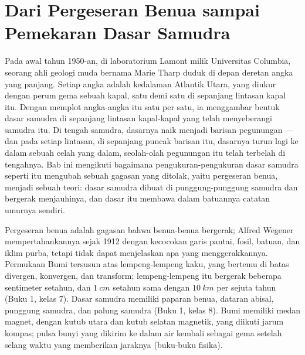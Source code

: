 \chapter{Dari Pergeseran Benua sampai Pemekaran Dasar Samudra}\label{ch:g11:drift-to-spreading}

Pada awal tahun 1950-an, di laboratorium Lamont milik Universitas Columbia,
seorang ahli geologi muda bernama Marie Tharp duduk di depan deretan angka yang
panjang. Setiap angka adalah kedalaman Atlantik Utara, yang diukur dengan perum
gema sebuah kapal, satu demi satu di sepanjang lintasan kapal itu. Dengan
memplot angka-angka itu satu per satu, ia menggambar bentuk dasar samudra di
sepanjang lintasan kapal-kapal yang telah menyeberangi samudra itu. Di tengah
samudra, dasarnya naik menjadi barisan pegunungan --- dan pada setiap lintasan,
di sepanjang puncak barisan itu, dasarnya turun lagi ke dalam sebuah celah yang
dalam, seolah-olah pegunungan itu telah terbelah di tengahnya. Bab ini
mengikuti bagaimana pengukuran-pengukuran dasar samudra seperti itu mengubah
sebuah gagasan yang ditolak, yaitu pergeseran benua, menjadi sebuah teori:
dasar samudra dibuat di punggung-punggung samudra dan bergerak menjauhinya,
dan dasar itu membawa dalam batuannya catatan umurnya sendiri.

\begin{recall}
Pergeseran benua adalah gagasan bahwa benua-benua bergerak; Alfred Wegener
mempertahankannya sejak 1912 dengan kecocokan garis pantai, fosil, batuan, dan
iklim purba, tetapi tidak dapat menjelaskan apa yang menggerakkannya. Permukaan
Bumi tersusun atas lempeng-lempeng kaku, yang bertemu di batas divergen,
konvergen, dan transform; lempeng-lempeng itu bergerak beberapa sentimeter
setahun, dan $\qty{1}{cm}$ setahun sama dengan $\qty{10}{km}$ per sejuta tahun
(Buku 1, kelas 7). Dasar samudra memiliki paparan benua, dataran abisal,
punggung samudra, dan palung samudra (Buku 1, kelas 8). Bumi memiliki medan
magnet, dengan kutub utara dan kutub selatan magnetik, yang diikuti jarum
kompas; pulsa bunyi yang dikirim ke dalam air kembali sebagai gema setelah
selang waktu yang memberikan jaraknya (buku-buku fisika).
\end{recall}


